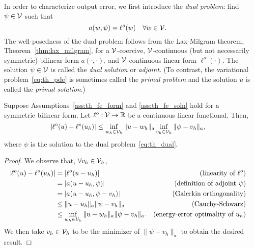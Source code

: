 In order to characterize output error, we first introduce the \emph{dual problem}: find $\psi \in \mathcal{V}$ such that
\begin{equation}
  \label{eq:th_dual}
  a(w,\psi) = \ell^o(w) \quad \forall w \in \mathcal{V}.
\end{equation}
The well-posedness of the dual problem follows from the Lax-Milgram theorem, Theorem~\ref{thm:lax_milgram}, for a $\mathcal{V}$-coercive, $\mathcal{V}$-continuous (but not necessarily symmetric) bilinear form $a(\cdot,\cdot)$, and $\mathcal{V}$-continuous linear form $\ell^o(\cdot)$.  The solution $\psi \in \mathcal{V}$ is called the \emph{dual solution} or \emph{adjoint}.  (To contrast, the variational problem~\eqref{eq:th_pde} is sometimes called the \emph{primal problem} and the solution $u$ is called the \emph{primal solution}.)

\begin{proposition}
  \label{prop:th_output_sym}
  Suppose Assumptions~\eqref{ass:th_fe_form} and \eqref{ass:th_fe_soln} hold for a symmetric bilinear form. Let $\ell^o: \mathcal{V} \to \mathbb{R}$ be a continuous linear functional. Then,
\begin{equation*}
  |\ell^o(u) - \ell^o(u_h)| \leq
  \inf_{w_h \in \mathcal{V}_h} \| u - w_h \|_a \inf_{v_h \in \mathcal{V}_h} \| \psi - v_h \|_a,
\end{equation*}
where $\psi$ is the solution to the dual problem~\ref{eq:th_dual}.
\begin{proof}
  We observe that, $\forall v_h \in \mathcal{V}_h$, 
\begin{align*}
  |\ell^o(u) - \ell^o(u_h)|
  &= |\ell^o(u - u_h)| & \text{(linearity of $\ell^o$)} \\
  &= |a(u-u_h,\psi)| & \text{(definition of adjoint $\psi$)} \\
  &= |a(u-u_h,\psi-v_h)| & \text{(Galerkin orthogonality)} \\
  &\leq \| u - u_h \|_a \| \psi - v_h \|_a & \text{(Cauchy-Schwarz)} \\
  &\leq \inf_{w_h \in \mathcal{V}_h} \| u - w_h \|_a \| \psi - v_h \|_a. & \text{(energy-error optimality of $u_h$)}
\end{align*}
We then take $v_h \in \mathcal{V}_h$ to be the minimizer of $\| \psi - v_h \|_a$ to obtain the desired result.
\end{proof}
\end{proposition}

